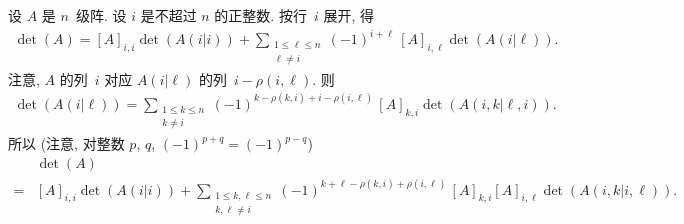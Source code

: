 \documentclass[../libro.tex]{subfiles}
\begin{document}
\begin{example}
    设 \(A\) 是 \(n\)~级阵.
    设 \(i\) 是不超过 \(n\) 的正整数.
    按行~\(i\) 展开, 得
    \begin{align*}
        \det {(A)}
        = [A]_{i,i} \det {(A(i|i))}
        + \sum_{\substack{1 \leq \ell \leq n \\ \ell \neq i}}
        {(-1)^{i+\ell}\, [A]_{i,\ell} \det {(A(i|\ell))}}.
    \end{align*}
    注意, \(A\) 的列~\(i\) 对应
    \(A(i|\ell)\) 的列~\(i - \rho(i, \ell)\).
    则
    \begin{align*}
        \det {(A(i|\ell))}
        = \sum_{\substack{1 \leq k \leq n \\ k \neq i}}
        {(-1)^{k - \rho(k, i) + i - \rho(i, \ell)}\,
        [A]_{k,i} \det {(A({i,k}|{\ell,i}))}}.
    \end{align*}
    所以 (注意, 对整数 \(p\), \(q\),
    \((-1)^{p+q} = (-1)^{p-q}\))
    \begin{align*}
        &
        \det {(A)}
        \\
        = {} &
        [A]_{i,i} \det {(A(i|i))}
        + \sum_{\substack{
                1 \leq k, \ell \leq n \\
        k, \ell \neq i}}
        {(-1)^{k+\ell-\rho(k,i)+\rho(i,\ell)}\,
        [A]_{k,i} [A]_{i,\ell} \det {(A({i,k}|{i,\ell}))}}.
    \end{align*}


\end{example}
\end{document}
